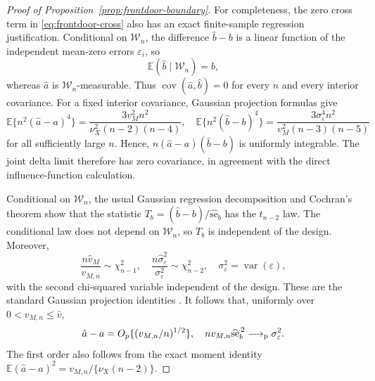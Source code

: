 \documentclass[12pt,a4paper]{article}
\theoremstyle{plain}
\theoremstyle{definition}
\newcommand{\E}{\mathbb{E}}
\newcommand{\var}{\operatorname{var}}
\newcommand{\cov}{\operatorname{cov}}
\newcommand{\pto}{\longrightarrow_{\rm p}}
\newcommand{\eps}{\varepsilon}
\begin{document}
\begin{proof}[Proof of Proposition~\ref{prop:frontdoor-boundary}]
    For completeness, the zero cross term in \eqref{eq:frontdoor-cross} also has an exact finite-sample regression justification.
    Conditional on $\mathcal{W}_n$, the difference $\hat{b}-b$ is a linear function of the independent mean-zero errors $\eps_i$, so
    \begin{equation*}
        \E(\hat{b}\mid\mathcal{W}_n)=b
        ,
    \end{equation*}
    whereas $\hat{a}$ is $\mathcal{W}_n$-measurable.
    Thus $\cov(\hat{a},\hat{b})=0$ for every $n$ and every interior covariance.
    For a fixed interior covariance, Gaussian projection formulas give
    \begin{equation*}
        \E\{n^2(\hat{a}-a)^4\}
        =
        \frac{3v_M^2n^2}{\nu_X^2(n-2)(n-4)}
        ,
        \quad
        \E\{n^2(\hat{b}-b)^4\}
        =
        \frac{3\sigma_\eps^4n^2}{v_M^2(n-3)(n-5)}
    \end{equation*}
    for all sufficiently large $n$.
    Hence, $n(\hat{a}-a)(\hat{b}-b)$ is uniformly integrable.
    The joint delta limit therefore has zero covariance, in agreement with the direct influence-function calculation.
    
    Conditional on $\mathcal{W}_n$, the usual Gaussian regression decomposition and Cochran's theorem show that the statistic $T_b=(\hat{b}-b)/\widehat{\mathrm{se}}_b$ has the $t_{n-2}$ law.
    The conditional law does not depend on $\mathcal{W}_n$, so $T_b$ is independent
    of the design.
    Moreover,
    \begin{equation*}
        \frac{n\hat{v}_M}{v_{M,n}}\sim\chi^2_{n-1}
        ,\quad
        \frac{n\hat{\sigma}_\eps^2}{\sigma_\eps^2}\sim\chi^2_{n-2}
        ,\quad
        \sigma_\eps^2=\var(\eps)
        ,
    \end{equation*}
    with the second chi-squared variable independent of the design.
    These are the standard Gaussian projection identities \citep[Ch.~3]{muirhead1982}.
    It follows that, uniformly over $0<v_{M,n}\le\bar v$,
    \begin{equation*}
        \hat{a}-a
        =
        O_p\{(v_{M,n}/n)^{1/2}\}
        ,
        \quad
        nv_{M,n}\widehat{\mathrm{se}}_b^{\,2}
        \pto
        \sigma_\eps^2
        .
    \end{equation*}
    The first order also follows from the exact moment identity $\E(\hat{a}-a)^2=v_{M,n}/\{\nu_X(n-2)\}$.
    

\end{proof}
\end{document}
